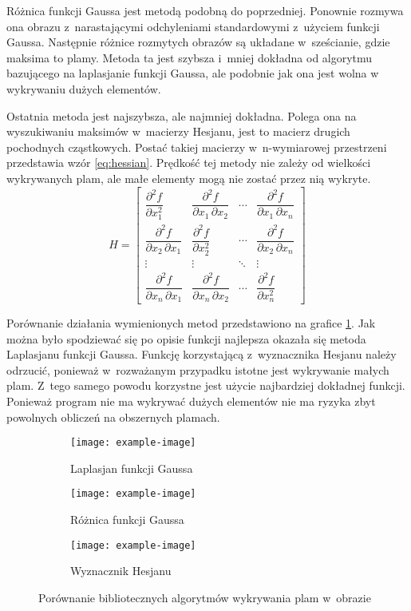 Różnica funkcji Gaussa jest metodą podobną do poprzedniej.
Ponownie rozmywa ona obrazu z~narastającymi odchyleniami standardowymi
z~użyciem funkcji Gaussa.
Następnie różnice rozmytych obrazów są układane w~sześcianie, gdzie
maksima to plamy.
Metoda ta jest szybsza i~mniej dokładna od algorytmu bazującego na laplasjanie
funkcji Gaussa, ale podobnie jak ona jest wolna w wykrywaniu dużych elementów.

Ostatnia metoda jest najszybsza, ale najmniej dokładna.
Polega ona na wyszukiwaniu maksimów w~macierzy Hesjanu, jest to macierz
drugich pochodnych cząstkowych.
Postać takiej macierzy w~n-wymiarowej przestrzeni przedstawia wzór
\ref{eq:hessian}.
Prędkość tej metody nie zależy od wielkości wykrywanych plam, ale małe
elementy mogą nie zostać przez nią wykryte.
\begin{equation}
	H = \begin{bmatrix}
	\dfrac{\partial^2 f}{\partial x_1^2} & 
	\dfrac{\partial^2 f}{\partial x_1\,\partial x_2} & 
	\cdots & \dfrac{\partial^2 f}{\partial x_1\,\partial x_n} \\[2.2ex]
	\dfrac{\partial^2 f}{\partial x_2\,\partial x_1} &
	\dfrac{\partial^2 f}{\partial x_2^2} &
	\cdots & \dfrac{\partial^2 f}{\partial x_2\,\partial x_n} \\[2.2ex]
	\vdots & \vdots & \ddots & \vdots \\[2.2ex]
	\dfrac{\partial^2 f}{\partial x_n\,\partial x_1} &
	\dfrac{\partial^2 f}{\partial x_n\,\partial x_2} &
	\cdots &
	\dfrac{\partial^2 f}{\partial x_n^2}
	\end{bmatrix}
\label{eq:hessian}
\end{equation}

Porównanie działania wymienionych metod przedstawiono na grafice
\ref{fig:blobcompare}.
Jak można było spodziewać się po opisie funkcji najlepsza okazała się metoda
Laplasjanu funkcji Gaussa.
Funkcję korzystającą z~wyznacznika Hesjanu należy odrzucić, ponieważ
w~rozważanym przypadku istotne jest wykrywanie małych plam.
Z~tego samego powodu korzystne jest użycie najbardziej dokładnej funkcji.
Ponieważ program nie ma wykrywać dużych elementów nie ma ryzyka zbyt
powolnych obliczeń na obszernych plamach.

\begin{figure}[htbp]
	\centering
	\begin{subfigure}[t]{0.3\textwidth}
		\centering
		\texttt{[image: example-image]}
		\caption{Laplasjan funkcji Gaussa}
	\end{subfigure}
	\hspace{0.25cm}
	\centering
	\begin{subfigure}[t]{0.3\textwidth}
		\centering
		\texttt{[image: example-image]}
		\caption{Różnica funkcji Gaussa}
	\end{subfigure}
	\hspace{0.25cm}
	\begin{subfigure}[t]{0.3\textwidth}
		\centering
		\texttt{[image: example-image]}
		\caption{Wyznacznik Hesjanu}
	\end{subfigure}
	\caption{Porównanie bibliotecznych algorytmów wykrywania plam w~obrazie}
	\label{fig:blobcompare}
\end{figure}

